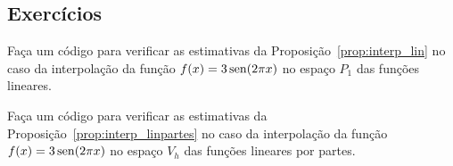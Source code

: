 \emconstrucao

\subsection{Exercícios}

\begin{exer}
  Faça um código para verificar as estimativas da Proposição~\ref{prop:interp_lin} no caso da interpolação da função $f(x) = 3\operatorname{sen}(2\pi x)$ no espaço $P_1$ das funções lineares.
\end{exer}

\begin{exer}
  Faça um código para verificar as estimativas da Proposição~\ref{prop:interp_linpartes} no caso da interpolação da função $f(x) = 3\operatorname{sen}(2\pi x)$ no espaço $V_h$ das funções lineares por partes.
\end{exer}

\emconstrucao